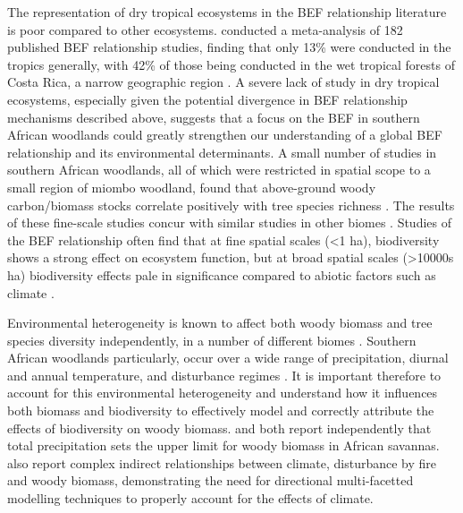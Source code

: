 \documentclass[11pt,a4paper]{article}
\begin{document}
The representation of dry tropical ecosystems in the BEF relationship literature is poor compared to other ecosystems. \citet{Clarke2017} conducted a meta-analysis of 182 published BEF relationship studies, finding that only 13\% were conducted in the tropics generally, with 42\% of those being conducted in the wet tropical forests of Costa Rica, a narrow geographic region \citep{Barthlott2005}. A severe lack of study in dry tropical ecosystems, especially given the potential divergence in BEF relationship mechanisms described above, suggests that a focus on the BEF in southern African woodlands could greatly strengthen our understanding of a global BEF relationship and its environmental determinants. A small number of studies in southern African woodlands, all of which were restricted in spatial scope to a small region of miombo woodland, found that above-ground woody carbon/biomass stocks correlate positively with tree species richness \citep{McNicol2018, Shirima2015, Mutowo2012}. The results of these fine-scale studies concur with similar studies in other biomes \citep{Cardinale2009}. Studies of the BEF relationship often find that at fine spatial scales (<1 ha), biodiversity shows a strong effect on ecosystem function, but at broad spatial scales  (>10000s ha) biodiversity effects pale in significance compared to abiotic factors such as climate \citep{Pasari2013}. 

Environmental heterogeneity is known to affect both woody biomass and tree species diversity independently, in a number of different biomes \citep{Spasojevic2014, Michaletz2018, Michaletz2014}. Southern African woodlands particularly, occur over a wide range of precipitation, diurnal and annual temperature, and disturbance regimes \citep{Frost1996}. It is important therefore to account for this environmental heterogeneity and understand how it influences both biomass and biodiversity to effectively model and correctly attribute the effects of biodiversity on woody biomass. \citet{Sankaran2005} and \citet{Lehmann2014} both report independently that total precipitation sets the upper limit for woody biomass in African savannas. \citet{Lehmann2014} also report complex indirect relationships between climate, disturbance by fire and woody biomass, demonstrating the need for directional multi-facetted modelling techniques to properly account for the effects of climate. 
\end{document}
